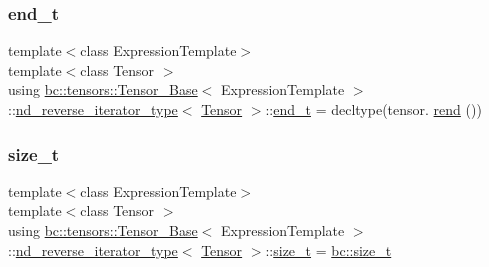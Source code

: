 \mbox{\label{structbc_1_1tensors_1_1Tensor__Base_1_1nd__reverse__iterator__type_a67cf55832f75d57560aa163bdaa89217}} 
\subsubsection{\texorpdfstring{end\+\_\+t}{end\_t}}
{\footnotesize\ttfamily template$<$class Expression\+Template$>$ \\
template$<$class Tensor $>$ \\
using \hyperlink{classbc_1_1tensors_1_1Tensor__Base}{bc\+::tensors\+::\+Tensor\+\_\+\+Base}$<$ Expression\+Template $>$\+::\hyperlink{structbc_1_1tensors_1_1Tensor__Base_1_1nd__reverse__iterator__type}{nd\+\_\+reverse\+\_\+iterator\+\_\+type}$<$ \hyperlink{namespacebc_a659391e47ab612be3ba6c18cf9c89159}{Tensor} $>$\+::\hyperlink{structbc_1_1tensors_1_1Tensor__Base_1_1nd__reverse__iterator__type_a67cf55832f75d57560aa163bdaa89217}{end\+\_\+t} =  decltype(tensor. \hyperlink{classbc_1_1tensors_1_1Tensor__Base_a91727f32f3b0182772ebb7968259c5e1}{rend} ())}

\mbox{\label{structbc_1_1tensors_1_1Tensor__Base_1_1nd__reverse__iterator__type_a7d4012a381490c1667a2fc0d6b7c0df4}} 
\subsubsection{\texorpdfstring{size\+\_\+t}{size\_t}}
{\footnotesize\ttfamily template$<$class Expression\+Template$>$ \\
template$<$class Tensor $>$ \\
using \hyperlink{classbc_1_1tensors_1_1Tensor__Base}{bc\+::tensors\+::\+Tensor\+\_\+\+Base}$<$ Expression\+Template $>$\+::\hyperlink{structbc_1_1tensors_1_1Tensor__Base_1_1nd__reverse__iterator__type}{nd\+\_\+reverse\+\_\+iterator\+\_\+type}$<$ \hyperlink{namespacebc_a659391e47ab612be3ba6c18cf9c89159}{Tensor} $>$\+::\hyperlink{structbc_1_1tensors_1_1Tensor__Base_1_1nd__reverse__iterator__type_a7d4012a381490c1667a2fc0d6b7c0df4}{size\+\_\+t} =  \hyperlink{namespacebc_aaf8e3fbf99b04b1b57c4f80c6f55d3c5}{bc\+::size\+\_\+t}}




